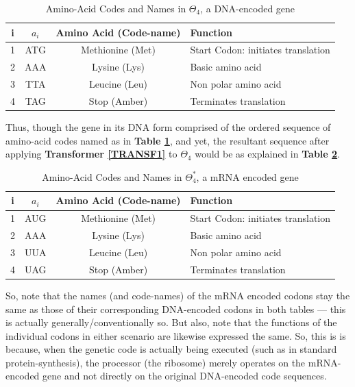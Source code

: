 \documentclass[a4paper, 18pt]{book} %
\begin{document}
\begin{table}[h]
  \centering
  \Large
	\begin{tabular}[t]{|c|c|c|p{3cm}|}
	\hline
	i & $a_i$ & \textbf{Amino Acid (Code-name)} & \textbf{Function}\\
	\hline
	\hline
	1 & ATG & Methionine (Met) & Start Codon: initiates translation\\
	\hline
	2 & AAA & Lysine (Lys) & Basic amino acid\\
	\hline
	3 & TTA & Leucine (Leu) & Non polar amino acid\\
	\hline
	4 & TAG & Stop (Amber) & Terminates translation\\
	
	\hline
	              
\end{tabular}
 \caption{Amino-Acid Codes and Names in $\Theta_4$, a DNA-encoded gene}
  \label{TAB1}
\end{table}

Thus, though the gene in its DNA form comprised of the ordered sequence of amino-acid codes named as in \textbf{Table \ref{TAB1}}, and yet, the resultant sequence after applying \textbf{Transformer \ref{TRANSF1}} to $\Theta_4$ would be as explained in \textbf{Table \ref{TAB2}}.


\begin{table}[h]
  \centering
  \Large
	\begin{tabular}[t]{|c|c|c|p{3cm}|}
	\hline
	i & $a_i$ & \textbf{Amino Acid (Code-name)} & \textbf{Function}\\
	\hline
	\hline
	1 & AUG & Methionine (Met) & Start Codon: initiates translation\\
	\hline
	2 & AAA & Lysine (Lys) & Basic amino acid\\
	\hline
	3 & UUA & Leucine (Leu) & Non polar amino acid\\
	\hline
	4 & UAG & Stop (Amber) & Terminates translation\\
	
	\hline
	              
\end{tabular}
 \caption{Amino-Acid Codes and Names in $\Theta_4^*$, a mRNA encoded gene}
  \label{TAB2}
\end{table}

So, note that the names (and code-names) of the mRNA encoded codons stay the same as those of their corresponding DNA-encoded codons in both tables --- this is actually generally/conventionally so. But also, note that the functions of the individual codons in either scenario are likewise expressed the same. So, this is is because, when the genetic code is actually being executed (such as in standard protein-synthesis), the processor (the ribosome) merely operates on the mRNA-encoded gene and not directly on the original DNA-encoded code sequences.
\end{document}
